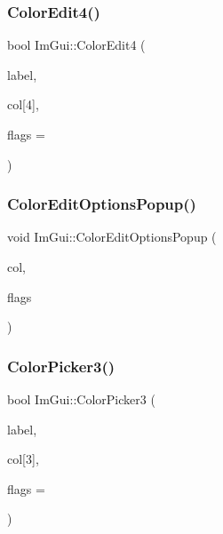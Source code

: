 \mbox{\label{namespace_im_gui_ac3f45e2aa0b1d591cc8a2cdf8b566a45}} 
\subsubsection{\texorpdfstring{Color\+Edit4()}{ColorEdit4()}}
{\footnotesize\ttfamily bool Im\+Gui\+::\+Color\+Edit4 (\begin{DoxyParamCaption}\item[{const char $\ast$}]{label,  }\item[{float}]{col\mbox{[}4\mbox{]},  }\item[{\mbox{\hyperlink{imgui_8h_a6b2d5e95adc38f22c021252189f669c6}{Im\+Gui\+Color\+Edit\+Flags}}}]{flags = {} }\end{DoxyParamCaption})}

\mbox{\label{namespace_im_gui_a6bfb117816d669f8704e5d0c0c0795fe}} 
\subsubsection{\texorpdfstring{Color\+Edit\+Options\+Popup()}{ColorEditOptionsPopup()}}
{\footnotesize\ttfamily void Im\+Gui\+::\+Color\+Edit\+Options\+Popup (\begin{DoxyParamCaption}\item[{const float $\ast$}]{col,  }\item[{\mbox{\hyperlink{imgui_8h_a6b2d5e95adc38f22c021252189f669c6}{Im\+Gui\+Color\+Edit\+Flags}}}]{flags }\end{DoxyParamCaption})}

\mbox{\label{namespace_im_gui_a2a2a98cb9a17b18702be6b954670b388}} 
\subsubsection{\texorpdfstring{Color\+Picker3()}{ColorPicker3()}}
{\footnotesize\ttfamily bool Im\+Gui\+::\+Color\+Picker3 (\begin{DoxyParamCaption}\item[{const char $\ast$}]{label,  }\item[{float}]{col\mbox{[}3\mbox{]},  }\item[{\mbox{\hyperlink{imgui_8h_a6b2d5e95adc38f22c021252189f669c6}{Im\+Gui\+Color\+Edit\+Flags}}}]{flags = {} }\end{DoxyParamCaption})}

